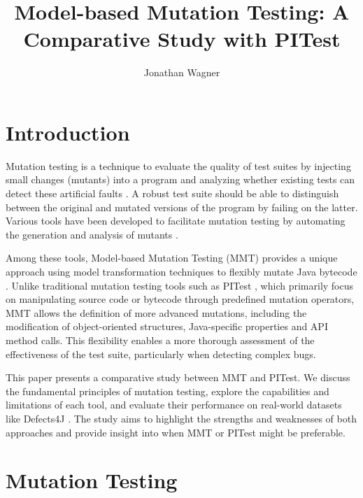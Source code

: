 \documentclass[sigplan, nonacm]{acmart}
\begin{document}
\title{Model-based Mutation Testing: A Comparative Study with PITest}

\author{Jonathan Wagner}

\maketitle

\section{Introduction}
Mutation testing is a technique to evaluate the quality of test suites by injecting small changes (mutants) into a program and analyzing whether existing tests can detect these artificial faults \cite{offutt_mutation_2001}. A robust test suite should be able to distinguish between the original and mutated versions of the program by failing on the latter. Various tools have been developed to facilitate mutation testing by automating the generation and analysis of mutants \cite{coles_pit_2016}.

Among these tools, Model-based Mutation Testing (MMT) provides a unique approach using model transformation techniques to flexibly mutate Java bytecode \cite{bockisch_mmt_2024, bockisch_mutation_2024}. Unlike traditional mutation testing tools such as PITest \cite{coles_pit_2016}, which primarily focus on manipulating source code or bytecode through predefined mutation operators, MMT allows the definition of more advanced mutations, including the modification of object-oriented structures, Java-specific properties and API method calls. This flexibility enables a more thorough assessment of the effectiveness of the test suite, particularly when detecting complex bugs.

This paper presents a comparative study between MMT and PITest. We discuss the fundamental principles of mutation testing, explore the capabilities and limitations of each tool, and evaluate their performance on real-world datasets like Defects4J \cite{just_defects4j_2014}. The study aims to highlight the strengths and weaknesses of both approaches and provide insight into when MMT or PITest might be preferable.

\section{Mutation Testing}
\end{document}

